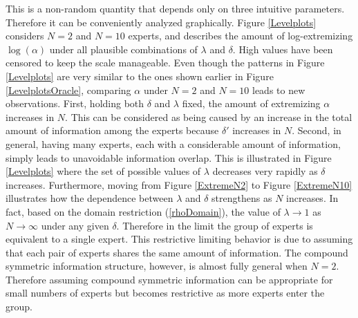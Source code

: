 \documentclass[11pt]{article}
\theoremstyle{definition}
\theoremstyle{definition}
\begin{document}
This is a non-random quantity that depends only on three intuitive parameters. Therefore it can be conveniently analyzed graphically. Figure \ref{Levelplots} considers $N = 2$ and $N = 10$ experts, and describes the amount of log-extremizing $\log(\alpha)$ under all plausible combinations of $\lambda$ and $\delta$. High values have been censored to keep the scale manageable. Even though the patterns in Figure \ref{Levelplots}  are very similar to the ones shown earlier in Figure \ref{LevelplotsOracle}, comparing $\alpha$ under $N = 2$ and $N = 10$ leads to new observations. First, holding both $\delta$ and $\lambda$ fixed, the amount of extremizing $\alpha$ increases in $N$. This can be considered as being caused by an increase in the total amount of information among the experts because $\delta'$ increases in $N$. Second, in general, having many experts, each with a considerable amount of information, simply leads to unavoidable information overlap. This is illustrated in Figure \ref{Levelplots} where the set of possible values of $\lambda$ decreases very rapidly as $\delta$ increases. Furthermore, moving from Figure \ref{ExtremeN2} to Figure \ref{ExtremeN10} illustrates how the dependence between $\lambda$ and $\delta$ strengthens as $N$ increases. In fact, based on the domain restriction (\ref{rhoDomain}), the value of $\lambda \to 1$ as $N \to \infty$ under any given $\delta$. Therefore in the limit the group of experts is equivalent to a single expert. This restrictive limiting behavior is due to assuming that each pair of experts shares the same amount of information. The compound symmetric information structure, however, is almost fully general when $N = 2$. Therefore assuming compound symmetric information can be appropriate for small numbers of experts but becomes restrictive as more experts enter the group. 
\end{document}
